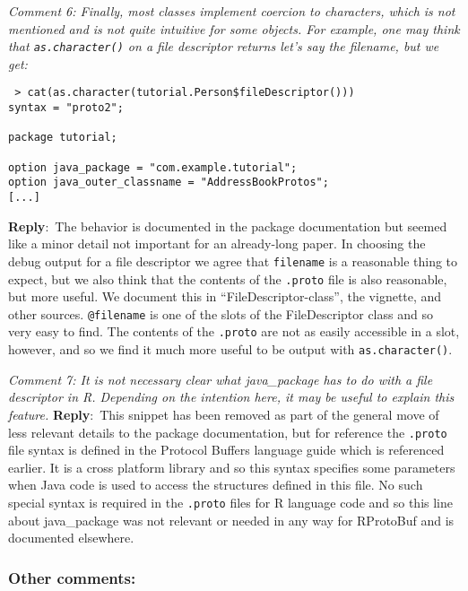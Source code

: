 \documentclass[10pt]{article}
\newcommand{\pointRaised}[2]{\smallskip %
  \textsl{{\fontseries{b}\selectfont #1}: #2}\newline}
\newcommand{\reply}[1]{\textbf{Reply}:\ #1 \smallskip } %
\begin{document}
\pointRaised{Comment 6}{Finally, most classes implement coercion to characters, which is not 
  mentioned and is not quite intuitive for some objects. For example, one
  may think that \texttt{as.character()} on a file descriptor returns let's say the 
  filename, but we get:}

\begin{verbatim}
 > cat(as.character(tutorial.Person$fileDescriptor()))
syntax = "proto2";

package tutorial;

option java_package = "com.example.tutorial";
option java_outer_classname = "AddressBookProtos";
[...]
\end{verbatim}
\reply{The behavior is documented in the package documentation but
  seemed like a minor detail not important for an already-long paper.
  In choosing the debug output for a file descriptor we agree
  that \texttt{filename} is a reasonable thing to expect, but we also
  think that the contents of the \texttt{.proto} file is also
  reasonable, but more useful.  We document this in
  ``FileDescriptor-class'', the vignette, and other sources.
  \texttt{@filename} is one of the slots of the FileDescriptor class
  and so very easy to find.  The contents of the \texttt{.proto} are
  not as easily accessible in a slot, however, and so we find it much
  more useful to be output with \texttt{as.character()}.}

\pointRaised{Comment 7}{It is not necessary clear what java\_package has to do with a file 
  descriptor in R. Depending on the intention here, it may be useful to 
  explain this feature.
}
\reply{This snippet has been removed as part of the general move of
  less relevant details to the package documentation, but for
  reference the \texttt{.proto} file syntax is defined in the Protocol Buffers
  language guide which is referenced earlier. It is a cross platform
  library and so this syntax specifies some parameters when Java code
  is used to access the structures defined in this file.  No such
  special syntax is required in the \texttt{.proto} files for R
  language code and so this line about java\_package was not relevant
  or needed in any way for RProtoBuf and is documented elsewhere.}

\subsubsection*{Other comments:}
\end{document}
